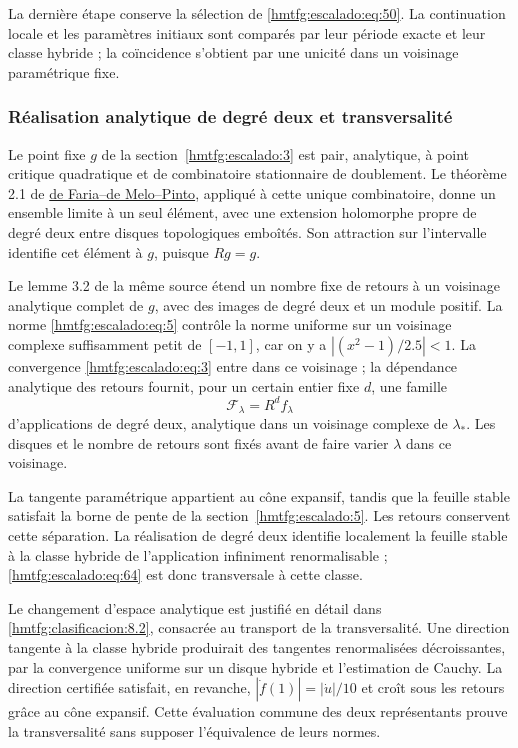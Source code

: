 La dernière étape conserve la sélection de \eqref{hmtfg:escalado:eq:50}. La continuation locale et les paramètres initiaux sont comparés par leur période exacte et leur classe hybride ; la coïncidence s’obtient par une unicité dans un voisinage paramétrique fixe.

\subsubsection{Réalisation analytique de degré deux et transversalité}
\label{hmtfg:escalado:17.1}

Le point fixe \(g\) de la section~\ref{hmtfg:escalado:3} est pair, analytique, à point critique quadratique et de combinatoire stationnaire de doublement. Le théorème 2.1 de \href{https://annals.math.princeton.edu/wp-content/uploads/annals-v164-n3-p01.pdf}{de Faria–de Melo–Pinto}, appliqué à cette unique combinatoire, donne un ensemble limite à un seul élément, avec une extension holomorphe propre de degré deux entre disques topologiques emboîtés. Son attraction sur l’intervalle identifie cet élément à \(g\), puisque \(Rg=g\).

Le lemme 3.2 de la même source étend un nombre fixe de retours à un voisinage analytique complet de \(g\), avec des images de degré deux et un module positif. La norme \eqref{hmtfg:escalado:eq:5} contrôle la norme uniforme sur un voisinage complexe suffisamment petit de \([-1,1]\), car on y a \(|(x^2-1)/2.5|<1\). La convergence \eqref{hmtfg:escalado:eq:3} entre dans ce voisinage ; la dépendance analytique des retours fournit, pour un certain entier fixe \(d\), une famille
\begin{equation}
\mathcal F_\lambda=R^d f_\lambda
\label{hmtfg:escalado:eq:64}
\end{equation}
d’applications de degré deux, analytique dans un voisinage complexe de \(\lambda_*\). Les disques et le nombre de retours sont fixés avant de faire varier \(\lambda\) dans ce voisinage.

La tangente paramétrique appartient au cône expansif, tandis que la feuille stable satisfait la borne de pente de la section~\ref{hmtfg:escalado:5}. Les retours conservent cette séparation. La réalisation de degré deux identifie localement la feuille stable à la classe hybride de l’application infiniment renormalisable ; \eqref{hmtfg:escalado:eq:64} est donc transversale à cette classe.

Le changement d’espace analytique est justifié en détail dans \ref{hmtfg:clasificacion:8.2}, consacrée au transport de la transversalité. Une direction tangente à la classe hybride produirait des tangentes renormalisées décroissantes, par la convergence uniforme sur un disque hybride et l’estimation de Cauchy. La direction certifiée satisfait, en revanche, \(|\dot f(1)|=|\dot u|/10\) et croît sous les retours grâce au cône expansif. Cette évaluation commune des deux représentants prouve la transversalité sans supposer l’équivalence de leurs normes.

